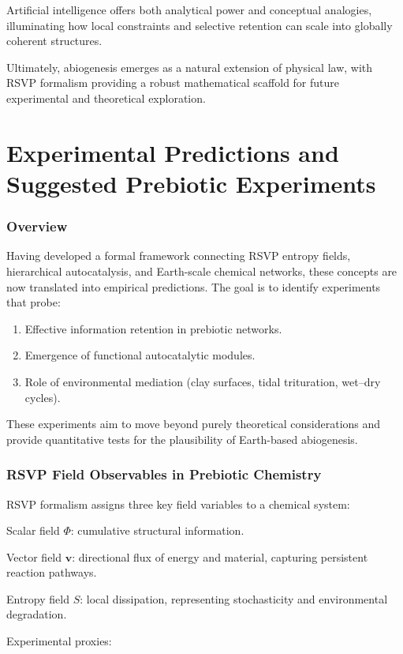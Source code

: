 \documentclass{book}
\begin{document}
Artificial intelligence offers both analytical power and conceptual analogies, illuminating how local constraints and selective retention can scale into globally coherent structures.

Ultimately, abiogenesis emerges as a natural extension of physical law, with RSVP formalism providing a robust mathematical scaffold for future experimental and theoretical exploration.

\part{Experimental Predictions and Suggested Prebiotic Experiments}

\section{Overview}
Having developed a formal framework connecting RSVP entropy fields, hierarchical autocatalysis, and Earth-scale chemical networks, these concepts are now translated into empirical predictions. The goal is to identify experiments that probe:

\begin{enumerate}
\item Effective information retention in prebiotic networks.
\item Emergence of functional autocatalytic modules.
\item Role of environmental mediation (clay surfaces, tidal trituration, wet–dry cycles).
\end{enumerate}

These experiments aim to move beyond purely theoretical considerations and provide quantitative tests for the plausibility of Earth-based abiogenesis.

\section{RSVP Field Observables in Prebiotic Chemistry}
RSVP formalism assigns three key field variables to a chemical system:

Scalar field $\Phi$: cumulative structural information.

Vector field $\mathbf{v}$: directional flux of energy and material, capturing persistent reaction pathways.

Entropy field $S$: local dissipation, representing stochasticity and environmental degradation.

Experimental proxies:
\end{document}

